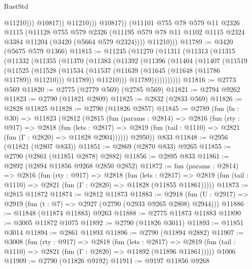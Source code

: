 \begin{lexlean}{RustStd}
\begin{coremodule}
{\begin{coremodule}
{{{{{{{{{{{{{{{{{{{{{{{{{{                            @11210)))
                      @10817))
                  @11210)))
            @10817))
        (@11101
          @755
          @78
          @579
          @11
          @2326
          @1115
          (@11128
            @755
            @579
            @2326
            (@11195 @579 @78 @11 @1102 @1115 @2324 @3384 @11204 (@3420 (@5664 @579 @2324))))
          @11210)))
@11789 := @3420 (@5675 @579 @1366)
@11815 := @11245
    (@11270
      (@11311
        (@11313
          (@11315
            (@11332
              (@11355
                (@11370
                  (@11383
                    (@11392
                      (@11396
                        (@11404
                          (@11407
                            (@11519
                              (@11525
                                (@11528
                                  (@11534
                                    (@11537 (@11639 (@11645 (@11648 (@11786 @11789)) @11210)))
                                    @11789))
                                @11210)))
                          @11789)))))))))))
@11816 := @2773 @569
@11820 := @2775 (@2779 @569) (@2785 @569)
@11821 := @2794 @9262
@11823 := @2790 (@11821 @2809)
@11825 := @2832 (@2833 @569)
@11826 := @2828 @11825
@11828 := @2790 (@11826 @2857)
@11845 := @2789
    (fun (fn : @30) =>
    @11823
      (@2812
        (@2815
          (fun (params : @2814) =>
          @2816
            (fun (rty : @917) =>
            @2818
              (fun (lets : @2817) =>
              @2819 (fun (tail : @1110) => @2821 (fun (Γ : @2820) => @11828 @2904))))))
        @2950))
    @833
@11848 := @2956 (@11821 (@2807 @833))
@11851 := @2869 (@2870 @833) @9265
@11855 := @2790 (@2861 (@11851 @2878) @2882)
@11856 := @2895 @833
@11861 := @2892 (@2894 @11856 @9268 @2850 @2852)
@11872 := fun (params : @2814) =>
  @2816
    (fun (rty : @917) =>
    @2818
      (fun (lets : @2817) =>
      @2819 (fun (tail : @1110) => @2821 (fun (Γ : @2820) => @11828 (@11855 @11861)))))
@11873 := @2815 @11872
@11874 := @2812 @11873
@11883 := @2918 (fun (U : @2917) => @2919 (fun (t : @7) => @2927 (@2790 (@2933 @9265 @2808) @2944)))
@11886 := @11848 (@11874 @11883) @9263
@11888 := @2775 @11873 @11883
@11890 := @3005 @11872 @1075
@11892 := @2790 (@11826 @3011)
@11893 := @11851 @3014
@11894 := @2861 @11893
@11896 := @2790 (@11894 @2882)
@11907 := @3008
    (fun (rty : @917) =>
    @2818
      (fun (lets : @2817) =>
      @2819 (fun (tail : @1110) => @2821 (fun (Γ : @2820) => @11892 (@11896 @11861)))))
    @1006
@11909 := @2790 (@11826 @9192)
@11911 := @9197 @11856 @9268
}}}}}}}}}}}}}}}}}}}}}}}}}}
\end{coremodule}}
\end{coremodule}
\end{lexlean}
